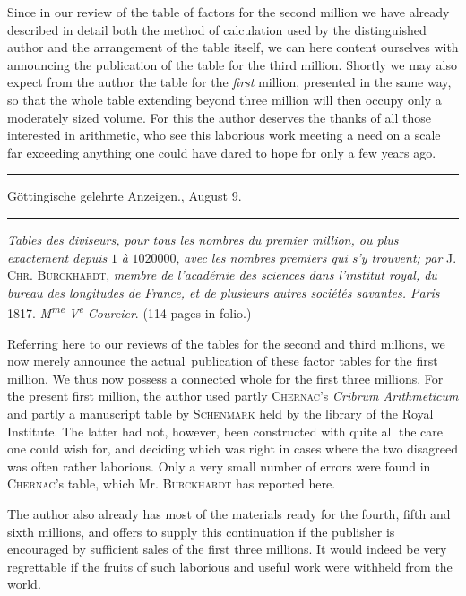 Since in our review of the table of factors for the second million we have already described in detail both the method of calculation used by the distinguished author and the arrangement of the table itself, we can here content ourselves with announcing the publication of the table for the third million. Shortly we may also expect from the author the table for the \emph{first} million, presented in the same way, so that the whole table extending beyond three million will then occupy only a moderately sized volume. For this the author deserves the thanks of all those interested in arithmetic, who see this laborious work meeting a need on a scale far exceeding anything one could have dared to hope for only a few years ago.

\begin{center}
\rule{.86\linewidth}{.3pt}\par
Göttingische gelehrte Anzeigen., August 9.\par
\rule{.86\linewidth}{.3pt}
\end{center}
\emph{Tables des diviseurs, pour tous les nombres du premier million, ou plus exactement depuis} $1$ \emph{à} $1020000$, \emph{avec les nombres premiers qui s'y trouvent; par} \textsc{J. Chr. Burckhardt}, \emph{membre de l'académie des sciences dans l'institut royal, du bureau des longitudes de France, et de plusieurs autres sociétés savantes. Paris} 1817. \emph{M\textsuperscript{me} V\textsuperscript{e} Courcier}. (114 pages in folio.)

Referring here to our reviews of the tables for the second and third millions, we now merely announce the actual\textperiodcentered\ publication of these factor tables for the first million. We thus now possess a connected whole for the first three millions. For the present first million, the author used partly \textsc{Chernac}'s \emph{Cribrum Arithmeticum} and partly a manuscript table by \textsc{Schenmark} held by the library of the Royal Institute. The latter had not, however, been constructed with quite all the care one could wish for, and deciding which was right in cases where the two disagreed was often rather laborious. Only a very small number of errors were found in \textsc{Chernac}'s table, which Mr. \textsc{Burckhardt} has reported here.

The author also already has most of the materials ready for the fourth, fifth and sixth millions, and offers to supply this continuation if the publisher is encouraged by sufficient sales of the first three millions. It would indeed be very regrettable if the fruits of such laborious and useful work were withheld from the world.

